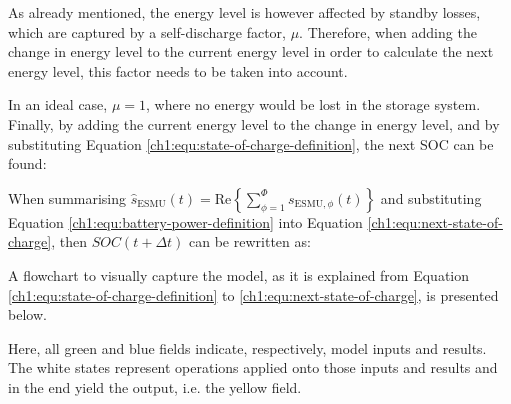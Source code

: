 

\nomenclature[I]{$\mu$}{Self-discharge losses of battery, where $\mu \in (0, 1]$ (Chapter \ref{ch1})}

As already mentioned, the energy level is however affected by standby losses, which are captured by a self-discharge factor, $\mu$.
Therefore, when adding the change in energy level to the current energy level in order to calculate the next energy level, this factor needs to be taken into account.



In an ideal case, $\mu = 1$, where no energy would be lost in the storage system.
Finally, by adding the current energy level to the change in energy level, and by substituting Equation \ref{ch1:equ:state-of-charge-definition}, the next SOC can be found:



When summarising $\hat{s}_\text{ESMU}(t) = \text{Re}\left\{\sum_{\phi=1}^{\Phi}s_{\text{ESMU},\phi}(t)\right\}$ and substituting Equation \ref{ch1:equ:battery-power-definition} into Equation \ref{ch1:equ:next-state-of-charge}, then $SOC(t+\Delta t)$ can be rewritten as:



A flowchart to visually capture the model, as it is explained from Equation \ref{ch1:equ:state-of-charge-definition} to \ref{ch1:equ:next-state-of-charge}, is presented below.



Here, all green and blue fields indicate, respectively, model inputs and results.
The white states represent operations applied onto those inputs and results and in the end yield the output, i.e. the yellow field.
